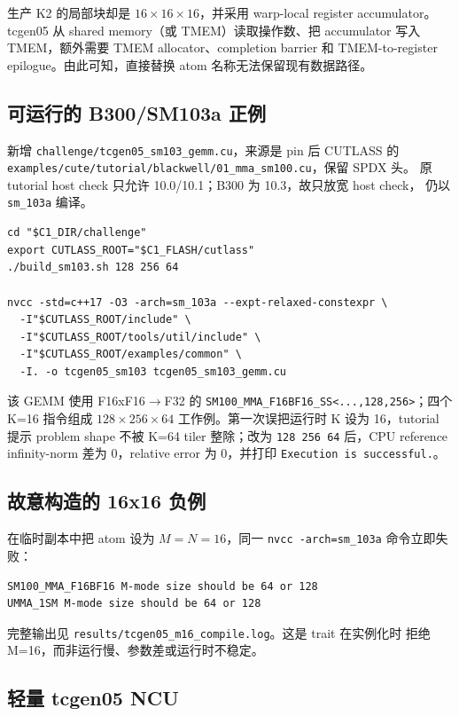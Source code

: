 \documentclass[11pt,a4paper,fontset=none]{ctexart}
\newcommand{\code}[1]{\texttt{#1}}
\begin{document}
生产 K2 的局部块却是 \(16\times16\times16\)，并采用 warp-local register
accumulator。tcgen05 从 shared memory（或 TMEM）读取操作数、把 accumulator
写入 TMEM，额外需要 TMEM allocator、completion barrier 和 TMEM-to-register
epilogue。由此可知，直接替换 atom 名称无法保留现有数据路径。

\subsection{可运行的 B300/SM103a 正例}

新增 \code{challenge/tcgen05\_sm103\_gemm.cu}，来源是 pin 后 CUTLASS 的
\code{examples/cute/tutorial/blackwell/01\_mma\_sm100.cu}，保留 SPDX 头。
原 tutorial host check 只允许 10.0/10.1；B300 为 10.3，故只放宽 host check，
仍以 \code{sm\_103a} 编译。

\begin{lstlisting}
cd "$C1_DIR/challenge"
export CUTLASS_ROOT="$C1_FLASH/cutlass"
./build_sm103.sh 128 256 64

nvcc -std=c++17 -O3 -arch=sm_103a --expt-relaxed-constexpr \
  -I"$CUTLASS_ROOT/include" \
  -I"$CUTLASS_ROOT/tools/util/include" \
  -I"$CUTLASS_ROOT/examples/common" \
  -I. -o tcgen05_sm103 tcgen05_sm103_gemm.cu
\end{lstlisting}

该 GEMM 使用 F16xF16$\rightarrow$F32 的
\code{SM100\_MMA\_F16BF16\_SS<...,128,256>}；四个 K=16 指令组成
\(128\times256\times64\) 工作例。第一次误把运行时 K 设为 16，tutorial
提示 problem shape 不被 K=64 tiler 整除；改为 \code{128 256 64} 后，CPU
reference infinity-norm 差为 0，relative error 为 0，并打印
\code{Execution is successful.}。

\subsection{故意构造的 16x16 负例}

在临时副本中把 atom 设为 \(M=N=16\)，同一 \code{nvcc -arch=sm\_103a}
命令立即失败：

\begin{lstlisting}
SM100_MMA_F16BF16 M-mode size should be 64 or 128
UMMA_1SM M-mode size should be 64 or 128
\end{lstlisting}

完整输出见 \code{results/tcgen05\_m16\_compile.log}。这是 trait 在实例化时
拒绝 M=16，而非运行慢、参数差或运行时不稳定。

\subsection{轻量 tcgen05 NCU}
\end{document}
